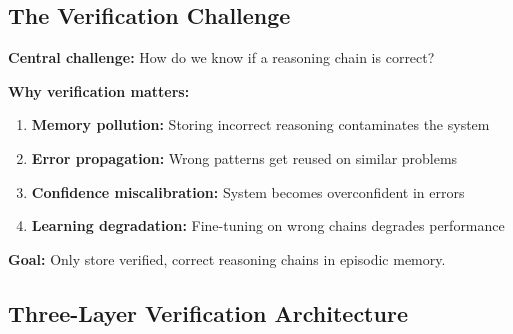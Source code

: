 \documentclass[12pt,a4paper]{article}
\theoremstyle{definition}
\begin{document}
\subsection{The Verification Challenge}

\begin{problembox}
\textbf{Central challenge:} How do we know if a reasoning chain is correct?

\textbf{Why verification matters:}
\begin{enumerate}
    \item \textbf{Memory pollution:} Storing incorrect reasoning contaminates the system
    \item \textbf{Error propagation:} Wrong patterns get reused on similar problems
    \item \textbf{Confidence miscalibration:} System becomes overconfident in errors
    \item \textbf{Learning degradation:} Fine-tuning on wrong chains degrades performance
\end{enumerate}

\textbf{Goal:} Only store verified, correct reasoning chains in episodic memory.
\end{problembox}

\subsection{Three-Layer Verification Architecture}
\end{document}
